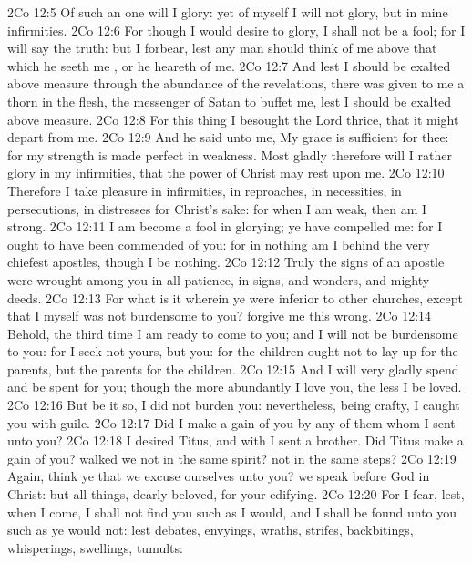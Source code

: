 \vs 2Co 12:5 Of such an one will I glory: yet of myself I will not glory, but in mine infirmities.
\vs 2Co 12:6 For though I would desire to glory, I shall not be a fool; for I will say the truth: but  I forbear, lest any man should think of me above that which he seeth me , or  he heareth of me.
\vs 2Co 12:7 And lest I should be exalted above measure through the abundance of the revelations, there was given to me a thorn in the flesh, the messenger of Satan to buffet me, lest I should be exalted above measure.
\vs 2Co 12:8 For this thing I besought the Lord thrice, that it might depart from me.
\vs 2Co 12:9 And he said unto me, My grace is sufficient for thee: for my strength is made perfect in weakness. Most gladly therefore will I rather glory in my infirmities, that the power of Christ may rest upon me.
\vs 2Co 12:10 Therefore I take pleasure in infirmities, in reproaches, in necessities, in persecutions, in distresses for Christ's sake: for when I am weak, then am I strong.
\vs 2Co 12:11 I am become a fool in glorying; ye have compelled me: for I ought to have been commended of you: for in nothing am I behind the very chiefest apostles, though I be nothing.
\vs 2Co 12:12 Truly the signs of an apostle were wrought among you in all patience, in signs, and wonders, and mighty deeds.
\vs 2Co 12:13 For what is it wherein ye were inferior to other churches, except  that I myself was not burdensome to you? forgive me this wrong.
\vs 2Co 12:14 Behold, the third time I am ready to come to you; and I will not be burdensome to you: for I seek not yours, but you: for the children ought not to lay up for the parents, but the parents for the children.
\vs 2Co 12:15 And I will very gladly spend and be spent for you; though the more abundantly I love you, the less I be loved.
\vs 2Co 12:16 But be it so, I did not burden you: nevertheless, being crafty, I caught you with guile.
\vs 2Co 12:17 Did I make a gain of you by any of them whom I sent unto you?
\vs 2Co 12:18 I desired Titus, and with  I sent a brother. Did Titus make a gain of you? walked we not in the same spirit?  not in the same steps?
\vs 2Co 12:19 Again, think ye that we excuse ourselves unto you? we speak before God in Christ: but  all things, dearly beloved, for your edifying.
\vs 2Co 12:20 For I fear, lest, when I come, I shall not find you such as I would, and  I shall be found unto you such as ye would not: lest  debates, envyings, wraths, strifes, backbitings, whisperings, swellings, tumults:

